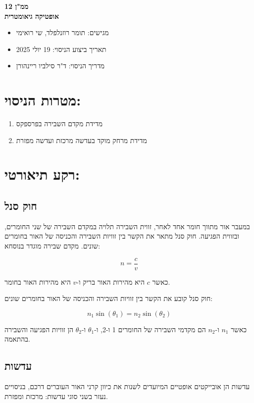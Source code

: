 \documentclass[12pt]{article}
\begin{document}
\begin{center}
    {\LARGE \textbf{ממ"ן 12}}\\
    {\textbf{אופטיקה גיאומטרית}}
\end{center}

\begin{itemize}
    \item מגישים: תומר רוזנלפלד, שי רואימי
    \item תאריך ביצוע הניסוי: 19 יולי 2025
    \item מדריך הניסוי: ד"ר סילביו ריינהורן
\end{itemize}

\section*{מטרות הניסוי:}
\begin{enumerate}
    \item מדידת מקדם השבירה בפרספקס
    \item מדידת מרחק מוקד בעדשה מרכזת ועדשה מפזרת
\end{enumerate}

\section*{רקע תיאורטי:}
\subsection*{חוק סנל}

במעבר אור מתווך חומר אחד לאחר, זווית השבירה תלויה במקדם השבירה של שני החומרים, ובזווית הפגיעה.
חוק סנל מתאר את הקשר בין זוויות השבירה והכניסה של האור בחומרים שונים.
מקדם שבירה מוגדר בנוסחא:

\begin{equation}
    n = \frac{c}{v}
\end{equation}

כאשר $c$ היא מהירות האור בריק ו-$v$ היא מהירות האור בחומר.


חוק סנל קובע את הקשר בין זוויות השבירה והכניסה של האור בחומרים שונים:

\begin{equation}
n_1 \sin(\theta_1) = n_2 \sin(\theta_2)
\end{equation}

כאשר $n_1$ ו-$n_2$ הם מקדמי השבירה של החומרים 1 ו-2, ו-$\theta_1$ ו-$\theta_2$ הן זוויות הפגיעה והשבירה בהתאמה.

\subsection*{עדשות}
עדשות הן אובייקטים אופטיים המיועדים לשנות את כיוון קרני האור העוברים דרכם, בניסויים נעזר בשני סוגי עדשות: מרכזת ומפזרת.
\end{document}
